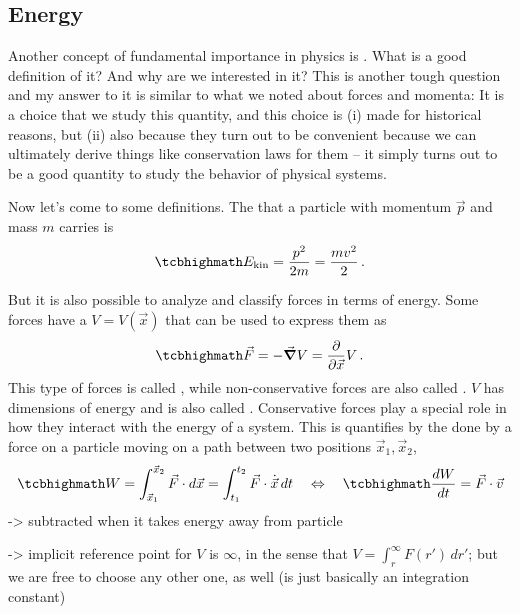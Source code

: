 \documentclass[../class_mech_main.tex]{subfiles}
\begin{document}
		\subsection{Energy}
Another concept of fundamental importance in physics is . What is a good definition of it? And why are we interested in it? This is another tough question and my answer to it is similar to what we noted about forces and momenta: It is a choice that we study this quantity, and this choice is (i) made for historical reasons, but (ii) also because they turn out to be convenient because we can ultimately derive things like conservation laws for them -- it simply turns out to be a good quantity to study the behavior of physical systems.

Now let's come to some definitions. The  that a particle with momentum $\vec{p}$ and mass $m$ carries is
\begin{equation}
	\eqbox{
		E_\mathrm{kin} = \frac{p^2}{2 m} = \frac{m v^2}{2}
	} \, .
\end{equation}


But it is also possible to analyze and classify forces in terms of energy. Some forces have a  $V = V(\vec{x})$ that can be used to express them as
\begin{equation}\label{eq:conservative_force}
	\eqbox{
		\vec{F} = - \grad V = \pdv{\vec{x}} V
	} \, .
\end{equation}
This type of forces is called , while non-conservative forces are also called . $V$ has dimensions of energy and is also called . Conservative forces play a special role in how they interact with the energy of a system. This is quantifies by the  done by a force on a particle moving on a path between two positions $\vec{x}_1, \vec{x}_2$,
\begin{equation}\label{eq:work}
	\eqbox{
		W = \int_{\vec{x}_1}^{\vec{x}_2} \vec{F} \cdot d\vec{x} = \int_{t_1}^{t_2} \vec{F} \cdot \dot{\vec{x}} \, dt
	}
	\quad \Leftrightarrow \quad
	\eqbox{
		\dv{W}{t} = \vec{F} \cdot \vec{v}
	}
\end{equation}
-> subtracted when it takes energy away from particle

-> implicit reference point for $V$ is $\infty$, in the sense that $V = \int_r^\infty F(r')\, dr'$; but we are free to choose any other one, as well (is just basically an integration constant)
\end{document}
